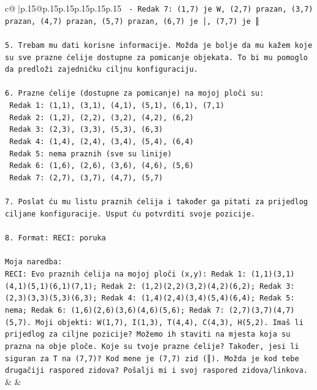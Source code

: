 \documentclass{article}
\begin{document}
{\begin{supertabular}{c@{$\;$}|p{.15\linewidth}@{}p{.15\linewidth}p{.15\linewidth}p{.15\linewidth}p{.15\linewidth}p{.15\linewidth}}
{{{\texttt{   {-} Redak 7: (1,7) je W, (2,7) prazan, (3,7) prazan, (4,7) prazan, (5,7) prazan, (6,7) je │, (7,7) je ║} \\
\\ 
\texttt{5. Trebam mu dati korisne informacije. Možda je bolje da mu kažem koje su sve prazne ćelije dostupne za pomicanje objekata. To bi mu pomoglo da predloži zajedničku ciljnu konfiguraciju.} \\
\\ 
\texttt{6. Prazne ćelije (dostupne za pomicanje) na mojoj ploči su:} \\
\texttt{   Redak 1: (1,1), (3,1), (4,1), (5,1), (6,1), (7,1)} \\
\texttt{   Redak 2: (1,2), (2,2), (3,2), (4,2), (6,2)} \\
\texttt{   Redak 3: (2,3), (3,3), (5,3), (6,3)} \\
\texttt{   Redak 4: (1,4), (2,4), (3,4), (5,4), (6,4)} \\
\texttt{   Redak 5: nema praznih (sve su linije)} \\
\texttt{   Redak 6: (1,6), (2,6), (3,6), (4,6), (5,6)} \\
\texttt{   Redak 7: (2,7), (3,7), (4,7), (5,7)} \\
\\ 
\texttt{7. Poslat ću mu listu praznih ćelija i također ga pitati za prijedlog ciljane konfiguracije. Usput ću potvrditi svoje pozicije.} \\
\\ 
\texttt{8. Format: RECI: poruka} \\
\\ 
\texttt{Moja naredba:} \\
\texttt{RECI: Evo praznih ćelija na mojoj ploči (x,y): Redak 1: (1,1)(3,1)(4,1)(5,1)(6,1)(7,1); Redak 2: (1,2)(2,2)(3,2)(4,2)(6,2); Redak 3: (2,3)(3,3)(5,3)(6,3); Redak 4: (1,4)(2,4)(3,4)(5,4)(6,4); Redak 5: nema; Redak 6: (1,6)(2,6)(3,6)(4,6)(5,6); Redak 7: (2,7)(3,7)(4,7)(5,7). Moji objekti: W(1,7), I(1,3), T(4,4), C(4,3), H(5,2). Imaš li prijedlog za ciljne pozicije? Možemo ih staviti na mjesta koja su prazna na obje ploče. Koje su tvoje prazne ćelije? Također, jesi li siguran za T na (7,7)? Kod mene je (7,7) zid (║). Možda je kod tebe drugačiji raspored zidova? Pošalji mi i svoj raspored zidova/linkova.} \\
            }
        }
    }
    & & \\ \\


\end{supertabular}}
\end{document}
